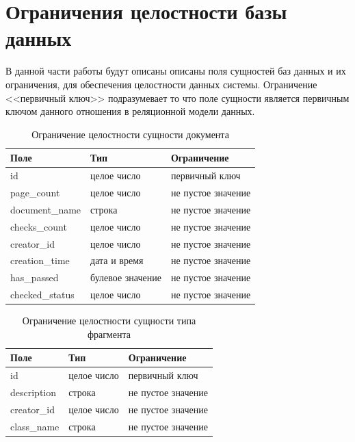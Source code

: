 \section{Ограничения целостности базы данных}
В данной части работы будут описаны описаны поля сущностей баз данных и их ограничения, для обеспечения целостности данных системы. Ограничение <<первичный ключ>> подразумевает то что поле сущности является первичным ключом данного отношения в реляционной модели данных.
\begin{table}[h!tbp]
	\centering
	\caption{Ограничение целостности сущности документа}
	\begin{tabularx}{\textwidth}{|X|X|X|}
		\hline
		Поле & Тип & Ограничение \\
		\hline
		id & целое число & первичный ключ \\
		\hline
		page\_count & целое число & не пустое значение\\
		\hline
		document\_name & строка & не пустое значение\\
		\hline
		checks\_count & целое число & не пустое значение\\
		\hline
		creator\_id & целое число & не пустое значение\\
		\hline
		creation\_time & дата и время & не пустое значение\\
		\hline
		has\_passed & булевое значение & не пустое значение\\
		\hline
		checked\_status & целое число & не пустое значение \\
		\hline
	\end{tabularx}

	\label{t:documents_cons}
\end{table}

\begin{table}[h!tbp]
	\centering
	\caption{Ограничение целостности сущности типа фрагмента}
	\begin{tabularx}{\textwidth}{|X|X|X|}
		\hline
		Поле & Тип & Ограничение \\
		\hline
	  	id & целое число & первичный ключ \\
	  	\hline
		description & строка & не пустое значение \\
		\hline
		creator\_id & целое число & не пустое значение\\
		\hline
		class\_name & строка & не пустое значение\\
		\hline
	\end{tabularx}
	
	\label{t:markup_type_cons}
\end{table}

